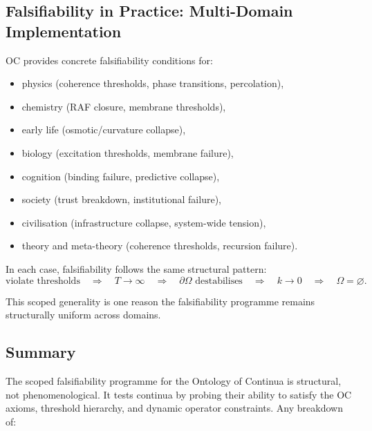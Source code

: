 \subsection{Falsifiability in Practice: Multi-Domain Implementation}

OC provides concrete falsifiability conditions for:

\begin{itemize}
    \item physics (coherence thresholds, phase transitions, percolation),
    \item chemistry (RAF closure, membrane thresholds),
    \item early life (osmotic/curvature collapse),
    \item biology (excitation thresholds, membrane failure),
    \item cognition (binding failure, predictive collapse),
    \item society (trust breakdown, institutional failure),
    \item civilisation (infrastructure collapse, system-wide tension),
    \item theory and meta-theory (coherence thresholds, recursion failure).
\end{itemize}

In each case, falsifiability follows the same structural pattern:
\[
\text{violate thresholds}
\quad \Rightarrow \quad
T \to \infty
\quad \Rightarrow \quad
\partial\Omega \text{ destabilises}
\quad \Rightarrow \quad
k \to 0
\quad \Rightarrow \quad
\Omega = \varnothing.
\]

This scoped generality is one reason the falsifiability programme remains
structurally uniform across domains.



\subsection{Summary}

The scoped falsifiability programme for the Ontology of Continua is
structural, not phenomenological.
It tests continua by probing their ability to satisfy the OC axioms,
threshold hierarchy, and dynamic operator constraints.
Any breakdown of:

